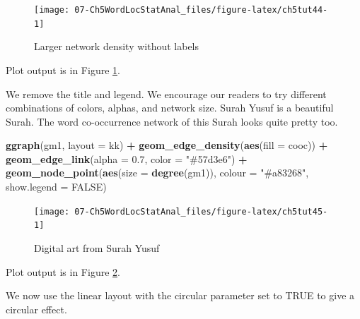 \documentclass[
]{article}
\newenvironment{Shaded}{\begin{snugshade}}{\end{snugshade}}
\newcommand{\AttributeTok}[1]{\textcolor[rgb]{0.13,0.29,0.53}{#1}}
\newcommand{\ConstantTok}[1]{\textcolor[rgb]{0.56,0.35,0.01}{#1}}
\newcommand{\FloatTok}[1]{\textcolor[rgb]{0.00,0.00,0.81}{#1}}
\newcommand{\FunctionTok}[1]{\textcolor[rgb]{0.13,0.29,0.53}{\textbf{#1}}}
\newcommand{\NormalTok}[1]{#1}
\newcommand{\SpecialCharTok}[1]{\textcolor[rgb]{0.81,0.36,0.00}{\textbf{#1}}}
\newcommand{\StringTok}[1]{\textcolor[rgb]{0.31,0.60,0.02}{#1}}
\begin{document}
\begin{figure}

{\centering \texttt{[image: 07-Ch5WordLocStatAnal\_files/figure-latex/ch5tut44-1]} 

}

\caption{Larger network density without labels}\label{fig:ch5tut44}
\end{figure}

Plot output is in Figure \ref{fig:ch5tut44}.

We remove the title and legend. We encourage our readers to try different combinations of colors, alphas, and network size. Surah Yusuf is a beautiful Surah. The word co-occurrence network of this Surah looks quite pretty too.

\begin{Shaded}
\begin{Highlighting}[]
\FunctionTok{ggraph}\NormalTok{(gm1, }\AttributeTok{layout =} \StringTok{\textquotesingle{}kk\textquotesingle{}}\NormalTok{) }\SpecialCharTok{+} 
      \FunctionTok{geom\_edge\_density}\NormalTok{(}\FunctionTok{aes}\NormalTok{(}\AttributeTok{fill =}\NormalTok{ cooc)) }\SpecialCharTok{+} 
      \FunctionTok{geom\_edge\_link}\NormalTok{(}\AttributeTok{alpha =} \FloatTok{0.7}\NormalTok{, }\AttributeTok{color =} \StringTok{"\#57d3e6"}\NormalTok{) }\SpecialCharTok{+}
      \FunctionTok{geom\_node\_point}\NormalTok{(}\FunctionTok{aes}\NormalTok{(}\AttributeTok{size =} \FunctionTok{degree}\NormalTok{(gm1)),}
                      \AttributeTok{colour =} \StringTok{"\#a83268"}\NormalTok{, }\AttributeTok{show.legend =} \ConstantTok{FALSE}\NormalTok{)}
\end{Highlighting}
\end{Shaded}

\begin{figure}

{\centering \texttt{[image: 07-Ch5WordLocStatAnal\_files/figure-latex/ch5tut45-1]} 

}

\caption{Digital art from Surah Yusuf}\label{fig:ch5tut45}
\end{figure}

Plot output is in Figure \ref{fig:ch5tut45}.

We now use the linear layout with the circular parameter set to TRUE to give a circular effect.
\end{document}

